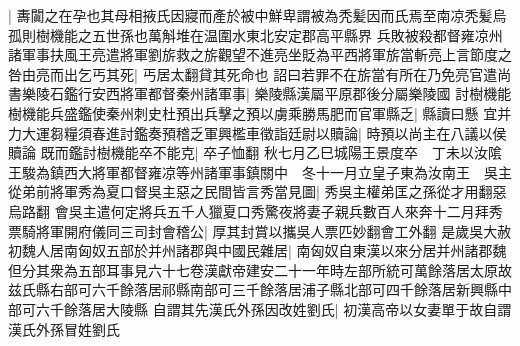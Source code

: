|{
	夀闐之在孕也其母相掖氏因寢而產於被中鮮卑謂被為秃髪因而氏焉至南凉秃髪烏孤則樹機能之五世孫也萬斛堆在温圍水東北安定郡高平縣界}
兵敗被殺都督雍凉州諸軍事扶風王亮遣將軍劉旂救之旂觀望不進亮坐貶為平西將軍旂當斬亮上言節度之咎由亮而出乞丐其死|{
	丐居太翻貸其死命也}
詔曰若罪不在旂當有所在乃免亮官遣尚書樂陵石鑑行安西將軍都督秦州諸軍事|{
	樂陵縣漢屬平原郡後分屬樂陵國}
討樹機能樹機能兵盛鑑使秦州刺史杜預出兵擊之預以虜乘勝馬肥而官軍縣乏|{
	縣讀曰懸}
宜并力大運芻糧須春進討鑑奏預稽乏軍興檻車徵詣廷尉以贖論|{
	時預以尚主在八議以侯贖論}
既而鑑討樹機能卒不能克|{
	卒子恤翻}
秋七月乙巳城陽王景度卒　丁未以汝隂王駿為鎮西大將軍都督雍凉等州諸軍事鎮關中　冬十一月立皇子東為汝南王　吳主從弟前將軍秀為夏口督吳主惡之民間皆言秀當見圖|{
	秀吳主權弟匡之孫從才用翻惡烏路翻}
會吳主遣何定將兵五千人獵夏口秀驚夜將妻子親兵數百人來奔十二月拜秀票騎將軍開府儀同三司封會稽公|{
	厚其封賞以攜吳人票匹妙翻會工外翻}
是歲吳大赦初魏人居南匈奴五部於并州諸郡與中國民雜居|{
	南匈奴自東漢以來分居并州諸郡魏但分其衆為五部耳事見六十七卷漢獻帝建安二十一年時左部所統可萬餘落居太原故兹氏縣右部可六千餘落居祁縣南部可三千餘落居浦子縣北部可四千餘落居新興縣中部可六千餘落居大陵縣}
自謂其先漢氏外孫因改姓劉氏|{
	初漢高帝以女妻單于故自謂漢氏外孫冒姓劉氏}


